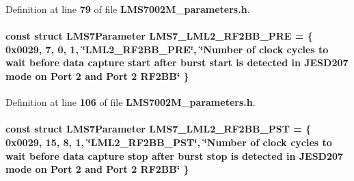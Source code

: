 Definition at line {\bf 79} of file {\bf L\+M\+S7002\+M\+\_\+parameters.\+h}.

\paragraph[{L\+M\+S7\+\_\+\+L\+M\+L2\+\_\+\+R\+F2\+B\+B\+\_\+\+P\+RE}]{\setlength{\rightskip}{0pt plus 5cm}const struct {\bf L\+M\+S7\+Parameter} L\+M\+S7\+\_\+\+L\+M\+L2\+\_\+\+R\+F2\+B\+B\+\_\+\+P\+RE = \{ 0x0029, 7, 0, 1, \char`\"{}\+L\+M\+L2\+\_\+\+R\+F2\+B\+B\+\_\+\+P\+R\+E\char`\"{}, \char`\"{}\+Number of clock cycles to wait before data capture start after burst start is detected in J\+E\+S\+D207 mode on Port 2 and Port 2 R\+F2\+B\+B\char`\"{} \}\hspace{0.3cm}{\ttfamily [static]}}\label{LMS7002M__parameters_8h_a02098232326bbba96e4f2454d139ecd2}


Definition at line {\bf 106} of file {\bf L\+M\+S7002\+M\+\_\+parameters.\+h}.

\paragraph[{L\+M\+S7\+\_\+\+L\+M\+L2\+\_\+\+R\+F2\+B\+B\+\_\+\+P\+ST}]{\setlength{\rightskip}{0pt plus 5cm}const struct {\bf L\+M\+S7\+Parameter} L\+M\+S7\+\_\+\+L\+M\+L2\+\_\+\+R\+F2\+B\+B\+\_\+\+P\+ST = \{ 0x0029, 15, 8, 1, \char`\"{}\+L\+M\+L2\+\_\+\+R\+F2\+B\+B\+\_\+\+P\+S\+T\char`\"{}, \char`\"{}\+Number of clock cycles to wait before data capture stop after burst stop is detected in J\+E\+S\+D207 mode on Port 2 and Port 2 R\+F2\+B\+B\char`\"{} \}\hspace{0.3cm}{\ttfamily [static]}}\label{LMS7002M__parameters_8h_a05bea790e74086c2a524d69a3b94852d}


